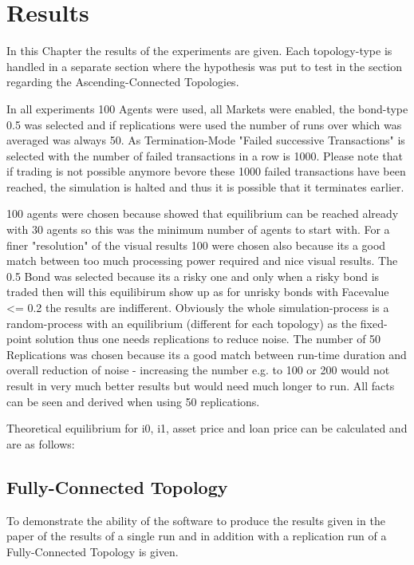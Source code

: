 \documentclass[Bachelorarbeit.tex]{subfiles}
\begin{document}
\chapter{Results}

In this Chapter the results of the experiments are given. Each topology-type is handled in a separate section where the hypothesis was put to test in the section regarding the Ascending-Connected Topologies.

In all experiments 100 Agents were used, all Markets were enabled, the bond-type 0.5 was selected and if replications were used the number of runs over which was averaged was always 50.
As Termination-Mode "Failed successive Transactions" is selected with the number of failed transactions in a row is 1000. Please note that if trading is not possible anymore bevore these 1000 failed transactions have been reached, the simulation is halted and thus it is possible that it terminates earlier.

100 agents were chosen because \cite{Breuer2015} showed that equilibrium can be reached already with 30 agents so this was the minimum number of agents to start with. For a finer "resolution" of the visual results 100 were chosen also because its a good match between too much processing power required and nice visual results.
The 0.5 Bond was selected because its a risky one and only when a risky bond is traded then will this equilibirum show up as for unrisky bonds with Facevalue <= 0.2 the results are indifferent.
Obviously the whole simulation-process is a random-process with an equilibrium (different for each topology) as the fixed-point solution thus one needs replications to reduce noise. The number of 50 Replications was chosen because its a good match between run-time duration and overall reduction of noise - increasing the number e.g. to 100 or 200 would not result in very much better results but would need much longer to run. All facts can be seen and derived when using 50 replications.

Theoretical equilibrium for i0, i1, asset price and loan price can be calculated and are as follows:


\section{Fully-Connected Topology}
To demonstrate the ability of the software to produce the results given in the paper of \cite{Breuer2015} the results of a single run and in addition with a replication run of a Fully-Connected Topology is given.
\end{document}
